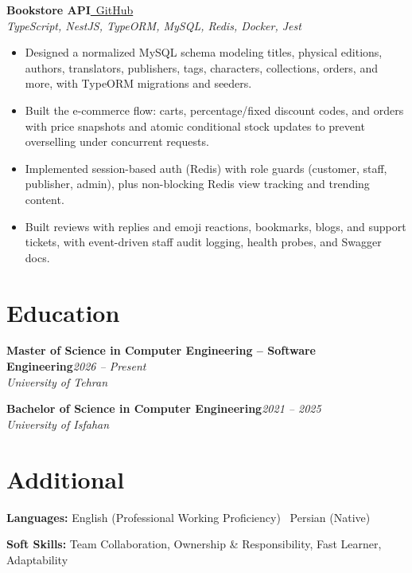 \documentclass[a4paper,10pt]{article}
\newcommand{\projectheader}[3]{%
  \noindent\textbf{#1}\hfill\href{#2}{\small\faGithub\ \color{linkblue}GitHub}\\[-2pt]
  {\small\color{medgray}\textit{#3}}
  \vspace{2pt}
}
\newcommand{\skillcategory}[2]{%
  \noindent\textbf{#1:} #2\par\vspace{2.5pt}%
}
\begin{document}
\projectheader
  {Bookstore API}
  {https://github.com/1mimhe/bookstore-nest}
  {TypeScript, NestJS, TypeORM, MySQL, Redis, Docker, Jest}

\begin{itemize}
  \item Designed a normalized MySQL schema modeling titles, physical editions, authors, translators, publishers, tags, characters, collections, orders, and more, with TypeORM migrations and seeders.
  \item Built the e-commerce flow: carts, percentage/fixed discount codes, and orders with price snapshots and atomic conditional stock updates to prevent overselling under concurrent requests.
  \item Implemented session-based auth (Redis) with role guards (customer, staff, publisher, admin), plus non-blocking Redis view tracking and trending content.
  \item Built reviews with replies and emoji reactions, bookmarks, blogs, and support tickets, with event-driven staff audit logging, health probes, and Swagger docs.
\end{itemize}

\section{Education}

\noindent\textbf{Master of Science in Computer Engineering -- Software Engineering}\hfill\textit{\small\color{medgray}2026 -- Present}\\
\textit{\color{medgray}University of Tehran}

\vspace{3pt}

\noindent\textbf{Bachelor of Science in Computer Engineering}\hfill\textit{\small\color{medgray}2021 -- 2025}\\
\textit{\color{medgray}University of Isfahan}

\section{Additional}

\skillcategory{Languages}{English (Professional Working Proficiency) \textbar\ Persian (Native)}

\skillcategory{Soft Skills}{Team Collaboration, Ownership \& Responsibility, Fast Learner, Adaptability}
\end{document}

